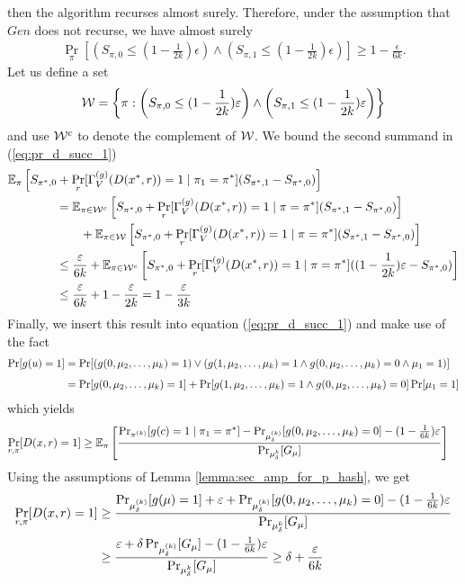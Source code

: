 then the algorithm recurses almost surely.
Therefore, under the assumption that $Gen$ does not recurse, we have almost surely
\begin{align}
\underset{\pi}{\Pr}\left[\left(S_{\pi,0} \leq (1 - \frac{1}{2k})\epsilon\right) \land \left( S_{\pi,1} \leq (1-\frac{1}{2k})\epsilon\right)\right] \geq 1 - \frac{\epsilon}{6k}.
\end{align}
Let us define a set
\begin{align}
  \cW = \left\{ \pi :  \left(S_{\pi,0} \leq (1 - \frac{1}{2k})\epsilon\right) \land \left( S_{\pi,1} \leq (1-\frac{1}{2k})\epsilon \right) \right\}
\end{align}
and use $\cW^c$ to denote the complement of $\cW$.
We bound the second summand in (\ref{eq:pr_d_succ_1})
\begin{align}
&\mathbb{E}_{\pi}\left[ S_{\pi^*,0} + \Pr_r [\Gamma_V^{(g)}(D(x^*,r)) = 1 \mid \pi_1 = \pi^*](S_{\pi^*,1} - S_{\pi^*,0}) \right] \notag\\
&\IndII = \mathbb{E}_{\pi \in \cW^c}\left[ S_{\pi^*,0} + \Pr_r [\Gamma_V^{(g)}(D(x^*,r)) = 1 \mid \pi = \pi^*](S_{\pi^*,1} - S_{\pi^*,0}) \right] \notag\\
&\IndIII +  \mathbb{E}_{\pi \in \cW}\left[ S_{\pi^*,0} + \Pr_r [\Gamma_V^{(g)}(D(x^*,r)) = 1 \mid \pi = \pi^*](S_{\pi^*,1} - S_{\pi^*,0}) \right] \\
&\IndII \leq \frac{\epsilon}{6k} + \mathbb{E}_{\pi \in \cW^c}\left[ S_{\pi^*,0} + \Pr_r [\Gamma_V^{(g)}(D(x^*,r)) = 1 \mid \pi = \pi^*]((1 - \frac{1}{2k})\epsilon - S_{\pi^*,0}) \right] \\
&\IndII \leq \frac{\epsilon}{6k} + 1 - \frac{\epsilon}{2k} = 1 - \frac{\epsilon}{3k}
\end{align}
Finally, we insert this result into equation (\ref{eq:pr_d_succ_1}) and make use of the fact
\begin{align*}
\underset{}{\Pr}[g(u) = 1] &= \underset{}{\Pr}[(g(0, \mu_2, \dots, \mu_k) = 1) \lor ( g(1,\mu_2, \dots, \mu_k) = 1 \land g(0, \mu_2, \dots, \mu_k) = 0 \land \mu_1 = 1)] \notag\\
&= \Pr[g(0,\mu_2, \dots,\mu_k) = 1] + \Pr[g(1,\mu_2,\dots,\mu_k) = 1 \land g(0, \mu_2, \dots, \mu_k) = 0] \Pr[\mu_1 = 1]
\end{align*}
which yields
\begin{align*}
  \underset{r,\pi}{\Pr}[D(x,r) = 1]
&\geq \mathbb{E}_{\pi}\left[\frac{{\Pr}_{\pi^{(k)}}[g(c) = 1 \mid \pi_1 = \pi^*] -
{\Pr}_{\mu_{\delta}^{(k)}}[g(0, \mu_2, \dots, \mu_k) = 0] - (1 - \frac{1}{6k})\epsilon} {{\Pr}_{\mu_{\delta}^{k}}[G_{\mu}]}\right] \notag
 \end{align*}
 Using the assumptions of Lemma \ref{lemma:sec_amp_for_p_hash}, we get
 \begin{align*}
   \underset{r,\pi}{\Pr}[D(x,r) = 1]
 &\geq \frac{ {\Pr}_{\mu_{\delta}^{(k)}}[g(\mu) = 1] + \epsilon +
 \Pr_{\mu_{\delta}^{(k)}}[g(0, \mu_2, \dots, \mu_k) = 0] - (1 - \frac{1}{6k})\epsilon}
 {\Pr_{\mu_{\delta}^{k}}[G_{\mu}]} \notag\\
 &\geq \frac{\epsilon +
\delta\Pr_{\mu_{\delta}^{(k)}}[G_{\mu}] - (1 - \frac{1}{6k})\epsilon}
{\Pr_{\mu_{\delta}^{k}}[G_{\mu}]} \geq \delta + \frac{\epsilon}{6k}
\end{align*}

